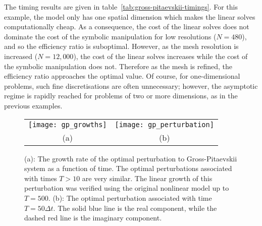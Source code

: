 \documentclass{siamltex}
\begin{document}
The timing results are given in table~\ref{tab:gross-pitaevskii-timings}. 
For this example, the model only has one spatial dimension which makes the linear solves computationally cheap.
As a consequence, the cost of the linear solves does not dominate the cost of the symbolic manipulation for low resolutions ($N = 480$),
and so the efficiency ratio is suboptimal.
However, as the mesh resolution is increased ($N = 12,000$), the cost of the linear solves increases while the cost of the symbolic manipulation 
does not. Therefore as the mesh is refined, the efficiency ratio approaches the optimal value. Of course, for one-dimensional problems, such fine
discretisations are often unnecessary; however, the asymptotic regime is rapidly reached for problems of two or more dimensions, as in the previous
examples.

\begin{figure}
  \centering
  \begin{tabular}{cc}
    \texttt{[image: gp\_growths]} &
    \texttt{[image: gp\_perturbation]} \\
    (a) & (b)
  \end{tabular}
  \caption{(a): The growth rate of the optimal perturbation to Gross-Pitaevskii system as a function of time. The optimal perturbations associated with times $T > 10$ are very similar. The linear growth of this perturbation was verified using the original nonlinear model up to $T=500$. (b): The optimal perturbation associated with time $T = 50 \Delta t$. The solid blue line is the real component, while the dashed red line is the imaginary component.}
  \label{fig:gp_growths}
\end{figure}
\end{document}
